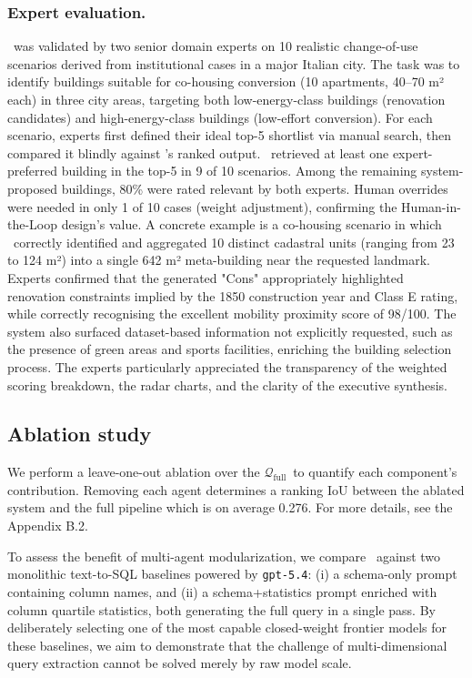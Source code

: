 \documentclass[runningheads,orivec]{llncs}
\newcommand{\gptfive}{\texttt{gpt-5.4}}
\newcommand{\completequeries}{$\mathcal{Q}_\text{full}$}
\begin{document}
\subsubsection{Expert evaluation.}
\label{sec:experteval}

\methodACR\ was validated by two senior domain experts on 10 realistic change-of-use scenarios derived from institutional cases in a major Italian city. The task was to identify buildings suitable for co-housing conversion (10 apartments, 40–70 m² each) in three city areas, targeting both low-energy-class buildings (renovation candidates) and high-energy-class buildings (low-effort conversion). For each scenario, experts first defined their ideal top-5 shortlist via manual search, then compared it blindly against \methodACR's ranked output.
\methodACR\ retrieved at least one expert-preferred building in the top-5 in 9 of 10 scenarios. Among the remaining system-proposed buildings, 80\% were rated relevant by both experts. Human overrides were needed in only 1 of 10 cases (weight adjustment), confirming the Human-in-the-Loop design's value.
A concrete example is a co-housing scenario in which \methodACR\ correctly identified and aggregated 10 distinct cadastral units (ranging from 23 to 124 m²) into a single 642 m² meta-building near the requested landmark. Experts confirmed that the generated "Cons" appropriately highlighted renovation constraints implied by the 1850 construction year and Class E rating, while correctly recognising the excellent mobility proximity score of 98/100. The system also surfaced dataset-based information not explicitly requested, such as the presence of green areas and sports facilities, enriching the building selection process.
The experts particularly appreciated the transparency of the weighted scoring breakdown, the radar charts, and the clarity of the executive synthesis.

\subsection{Ablation study}
\label{sec:ablation}
We perform a leave-one-out ablation over the \completequeries\ to quantify each component's contribution. Removing each agent determines a ranking IoU between the ablated system and the full pipeline which is on average 0.276. For more details, see the Appendix B.2.

To assess the benefit of multi-agent modularization, we compare \methodACR\ against two monolithic text-to-SQL baselines powered by \gptfive: (i) a schema-only prompt containing column names, and (ii) a schema+statistics prompt enriched with column quartile statistics, both generating the full query in a single pass. By deliberately selecting one of the most capable closed-weight frontier models for these baselines, we aim to demonstrate that the challenge of multi-dimensional query extraction cannot be solved merely by raw model scale. 
\end{document}
